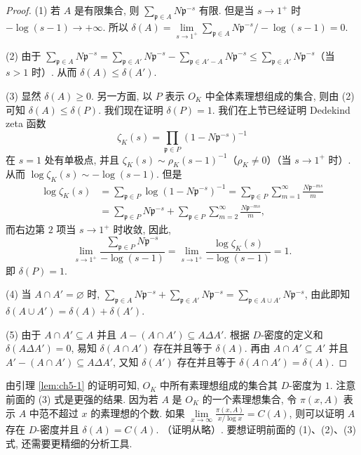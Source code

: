 \begin{proof}
(1) 若 $A$ 是有限集合, 则 $\sum\limits_{\mathfrak{p}\in A}N\mathfrak{p}^{-s}$ 有限. 但是当 $s\to1^+$ 时 $-\log(s-1)\to+\infty$. 所以 $\delta(A)=\lim\limits_{s\to1^+}\sum\limits_{\mathfrak{p}\in A}N\mathfrak{p}^{-s}/-\log(s-1)=0$. 

(2) 由于 $\sum\limits_{\mathfrak{p}\in A}N\mathfrak{p}^{-s}=\sum\limits_{\mathfrak{p}\in A'}N\mathfrak{p}^{-s}-\sum\limits_{\mathfrak{p}\in A'-A}N\mathfrak{p}^{-s}\leqslant\sum\limits_{\mathfrak{p}\in A'}N\mathfrak{p}^{-s}$（当 $s>1$ 时）. 从而 $\delta(A)\leqslant\delta(A')$. 

(3) 显然 $\delta(A)\geqslant 0$. 另一方面, 以 $P$ 表示 $O_K$ 中全体素理想组成的集合, 则由 (2) 可知 $\delta(A)\leqslant\delta(P)$. 我们现在证明 $\delta(P)=1$. 我们在上节已经证明 Dedekind zeta 函数
\[
  \zeta_K(s)=\prod_{\mathfrak{p}\in P}(1-N\mathfrak{p}^{-s})^{-1}
\]
在 $s=1$ 处有单极点, 并且 $\zeta_K(s)\sim\rho_K(s-1)^{-1}$（$\rho_K\neq 0$）（当 $s\to1^+$ 时）. 从而 $\log\zeta_K(s)\sim-\log(s-1)$. 但是
\begin{align*}
  \log\zeta_K(s)&=\sum\limits_{\mathfrak{p}\in P}\log(1-N\mathfrak{p}^{-s})^{-1}
  =\sum\limits_{\mathfrak{p}\in P}\sum\limits_{m=1}^{\infty}\frac{N\mathfrak{p}^{-ms}}{m}\\
  &=\sum\limits_{\mathfrak{p}\in P}N\mathfrak{p}^{-s}+\sum\limits_{\mathfrak{p}\in P}\sum\limits_{m=2}^{\infty}\frac{N\mathfrak{p}^{-ms}}{m},
\end{align*}
而右边第 $2$ 项当 $s\to1^+$ 时收敛, 因此, 
\[
  \lim\limits_{s\to1^+}\frac{\sum\limits_{\mathfrak{p}\in P}N\mathfrak{p}^{-s}}{-\log(s-1)}
  =\lim\limits_{s\to1^+}\frac{\log\zeta_K(s)}{-\log(s-1)}=1.
\]
即 $\delta(P)=1$. 

(4) 当 $A\cap A'=\varnothing$ 时, $\sum\limits_{\mathfrak{p}\in A}N\mathfrak{p}^{-s}+\sum\limits_{\mathfrak{p}\in A'}N\mathfrak{p}^{-s}=\sum\limits_{\mathfrak{p}\in A\cup A'}N\mathfrak{p}^{-s}$, 由此即知 $\delta(A\cup A')=\delta(A)+\delta(A')$. 

(5) 由于 $A\cap A'\subseteq A$ 并且 $A-(A\cap A')\subseteq A\Delta A'$. 根据 $D$-密度的定义和 $\delta(A\Delta A')=0$, 易知 $\delta(A\cap A')$ 存在并且等于 $\delta(A)$. 再由 $A\cap A'\subseteq A'$ 并且 $A'-(A\cap A')\subseteq A\Delta A'$, 又知 $\delta(A')$ 存在并且等于 $\delta(A\cap A')=\delta(A)$. 
\end{proof}

\begin{remark}
由引理 \ref{lem:ch5-1} 的证明可知, $O_K$ 中所有素理想组成的集合其 $D$-密度为 $1$. 注意前面的 (3) 式是更强的结果. 因为若 $A$ 是 $O_K$ 的一个素理想集合, 令 $\pi(x,A)$ 表示 $A$ 中范不超过 $x$ 的素理想的个数. 如果 $\lim\limits_{x\to\infty}\frac{\pi(x,A)}{x/\log x}=C(A)$, 则可以证明 $A$ 存在 $D$-密度并且 $\delta(A)=C(A)$. （证明从略）. 要想证明前面的 (1)、(2)、(3) 式, 还需要更精细的分析工具. 
\end{remark}

